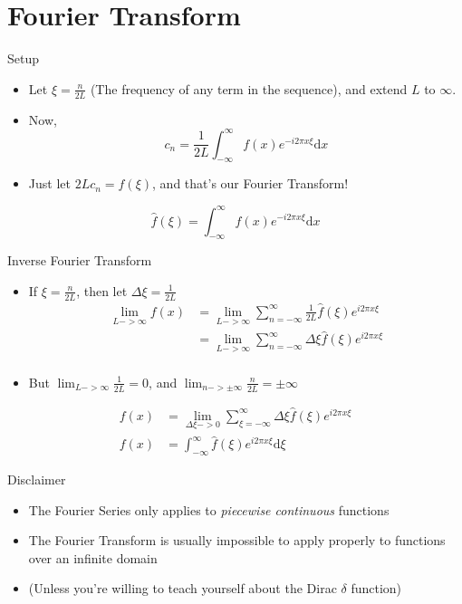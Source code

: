 	\section{Fourier Transform}
	\begin{namedframe}{Setup}
		\begin{itemize}
			\item{Let $\xi = \frac{n}{2L}$ (The frequency of any term in the sequence), and extend $L$ to $\infty$.}
			\item{Now, \begin{equation*}c_n = \frac{1}{2L}\int_{-\infty}^{\infty}f(x)e^{-i2\pi x\xi}\mathrm{d}x\end{equation*}}
			\item{Just let $2Lc_n = \hat{f}(\xi)$, and that's our Fourier Transform!}
		\end{itemize}
		\begin{equation*}
			\hat{f}(\xi) = \int_{-\infty}^{\infty}f(x)e^{-i2\pi x\xi}\mathrm{d}x
		\end{equation*}
	\end{namedframe}
	\begin{namedframe}{Inverse Fourier Transform}
		\begin{itemize}
			\item{If $\xi = \frac{n}{2L}$, then let $\Delta\xi = \frac{1}{2L}$
		\begin{align*}
			\lim_{L->\infty}f(x) &= \lim_{L->\infty}\sum_{n=-\infty}^{\infty}\frac{1}{2L}\hat{f}(\xi)e^{i2\pi x\xi}\\
			&= \lim_{L->\infty}\sum_{n=-\infty}^{\infty}\Delta\xi\hat{f}(\xi)e^{i2\pi x\xi}\\
		\end{align*}
	}\item{But $\lim_{L->\infty} \frac{1}{2L} = 0$, and $\lim_{n->\pm\infty}\frac{n}{2L} = \pm\infty$}
		\end{itemize}
		\begin{align*}
			f(x) &= \lim_{\Delta\xi->0}\sum_{\xi=-\infty}^{\infty}\Delta\xi\hat{f}(\xi)e^{i2\pi x\xi}\\
			f(x) &= \int_{-\infty}^{\infty}\hat{f}(\xi)e^{i2\pi x\xi}\mathrm{d}\xi
		\end{align*}
	\end{namedframe}
	\begin{namedframe}{Disclaimer}
		\begin{itemize}
			\item{The Fourier Series only applies to \textit{piecewise continuous} functions}
			\item{The Fourier Transform is usually impossible to apply properly to functions over an infinite domain}
			\item{(Unless you're willing to teach yourself about the Dirac $\delta$ function)}
		\end{itemize}
	\end{namedframe}

